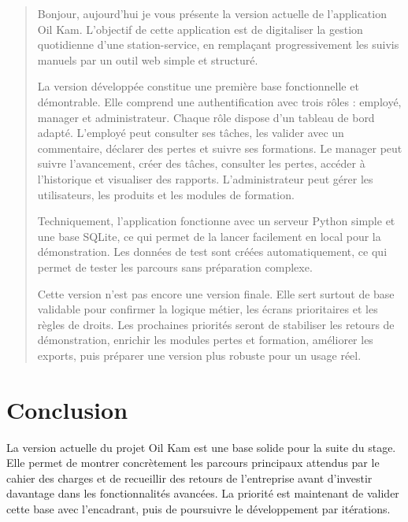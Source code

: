\documentclass[11pt,a4paper]{article}
\begin{document}
\begin{quote}
Bonjour, aujourd'hui je vous présente la version actuelle de l'application Oil Kam. L'objectif de cette application est de digitaliser la gestion quotidienne d'une station-service, en remplaçant progressivement les suivis manuels par un outil web simple et structuré.

La version développée constitue une première base fonctionnelle et démontrable. Elle comprend une authentification avec trois rôles : employé, manager et administrateur. Chaque rôle dispose d'un tableau de bord adapté. L'employé peut consulter ses tâches, les valider avec un commentaire, déclarer des pertes et suivre ses formations. Le manager peut suivre l'avancement, créer des tâches, consulter les pertes, accéder à l'historique et visualiser des rapports. L'administrateur peut gérer les utilisateurs, les produits et les modules de formation.

Techniquement, l'application fonctionne avec un serveur Python simple et une base SQLite, ce qui permet de la lancer facilement en local pour la démonstration. Les données de test sont créées automatiquement, ce qui permet de tester les parcours sans préparation complexe.

Cette version n'est pas encore une version finale. Elle sert surtout de base validable pour confirmer la logique métier, les écrans prioritaires et les règles de droits. Les prochaines priorités seront de stabiliser les retours de démonstration, enrichir les modules pertes et formation, améliorer les exports, puis préparer une version plus robuste pour un usage réel.
\end{quote}

\section*{Conclusion}

La version actuelle du projet Oil Kam est une base solide pour la suite du stage. Elle permet de montrer concrètement les parcours principaux attendus par le cahier des charges et de recueillir des retours de l'entreprise avant d'investir davantage dans les fonctionnalités avancées. La priorité est maintenant de valider cette base avec l'encadrant, puis de poursuivre le développement par itérations.
\end{document}
